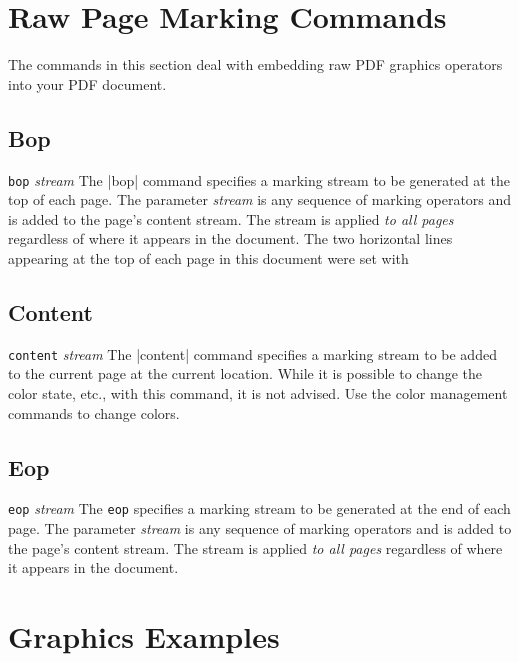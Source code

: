 {{\section{Raw Page Marking Commands}
The commands in this section deal with embedding
raw PDF graphics operators into your PDF document.

\subsection{Bop}
\syntax
{\tt bop} {\it stream}
\description
The |bop| command specifies a marking
stream to be generated at the top of each page.
The parameter {\it stream} is any sequence
of marking operators and is added to the page's content stream.  
The stream is applied {\it to all pages} regardless
of where it appears in the document.
\example  The two horizontal lines appearing
at the top of each page in this document
were set with
\begintt
{}
\endtt
{}

\subsection{Content}
\syntax
{\tt content} {\it stream}
\description
The |content| command specifies a marking
stream to be added to the current page at
the current location.  While it
is possible to change the color
state, etc., with this command, it is
not advised.  Use the color management
commands to change colors.


\subsection{Eop}
\syntax
\beginlist
{\tt eop} {\it stream}
\endlist
\description
The {\tt eop} specifies a marking stream to be generated at the end
of each page. The parameter {\it stream} is any sequence
of marking operators and is added to the page's content stream.  
The stream is applied {\it to all pages} regardless
of where it appears in the document.

\section{Graphics Examples}

}}
